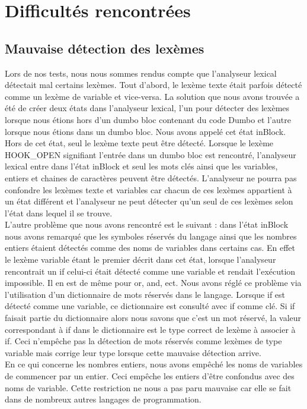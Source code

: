 \documentclass[a4paper,10pt]{article}
\begin{document}
\section{Difficultés rencontrées}

\subsection{Mauvaise détection des lexèmes}
Lors de nos tests, nous nous sommes rendus compte que l'analyseur lexical détectait mal certains lexèmes. Tout d'abord, le lexème texte était parfois détecté comme un lexème de variable
et vice-versa. La solution que nous avons trouvée a été de créer deux états dans l'analyseur lexical, l'un pour détecter des lexèmes lorsque nous étions hors d'un dumbo bloc 
contenant du code Dumbo et l'autre lorsque nous étions dans un dumbo bloc. Nous avons appelé cet état inBlock. Hors de cet état, seul le lexème texte peut être détecté. 
Lorsque le lexème HOOK\_OPEN signifiant l'entrée dans un dumbo bloc est rencontré, l'analyseur lexical entre dans l'état inBlock et seul les mots clés ainsi que les variables, entiers et 
chaines de caractères peuvent être détectés. L'analyseur ne pourra pas confondre les lexèmes texte et variables car chacun de ces lexèmes appartient à un état différent et l'analyseur 
ne peut détecter qu'un seul de ces lexèmes selon l'état dans lequel il se trouve. \\
L'autre problème que nous avons rencontré est le suivant : dans l'état inBlock nous avons remarqué que les symboles réservés du langage ainsi que les nombres entiers 
étaient détectés comme des noms de variables dans certains cas. En effet le lexème variable étant le premier décrit dans cet état, lorsque l'analyseur rencontrait un \textrm{if} celui-ci 
était détecté comme une variable et rendait l'exécution impossible. Il en est de même pour \textrm{or}, \textrm{and}, ect. Nous avons réglé ce problème via l'utilisation d'un dictionnaire
de mots réservés dans le langage. Lorsque \textrm{if} est détecté comme une variable, ce dictionnaire est consulté avec \textrm{if} comme clé. Si if faisait partie du dictionnaire 
alors nous savons que c'est un mot réservé, la valeur correspondant à \textrm{if} dans le dictionnaire est le type correct de lexème à associer à \textrm{if}. Ceci n'empêche pas la détection
de mots réservés comme lexèmes de type variable mais corrige leur type lorsque cette mauvaise détection arrive.\\
En ce qui concerne les nombres entiers, nous avons empêché les noms de variables de commencer par un entier. Ceci empêche les entiers d'être confondus avec des noms de variable. 
Cette restriction ne nous a pas paru mauvaise car elle se fait dans de nombreux autres langages de programmation.
\end{document}
